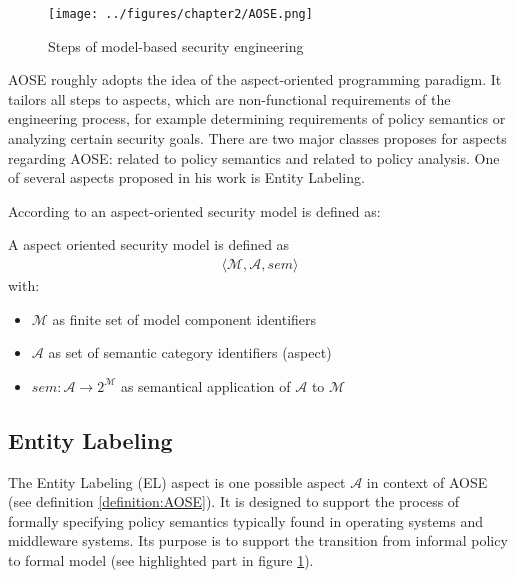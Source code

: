 \documentclass[twoside, openright, 12pt]{book}
\begin{document}
\begin{figure}[htb]
	\centering
	\texttt{[image: ../figures/chapter2/AOSE.png]}
	\caption{Steps of model-based security engineering \citep{Amthor18}}
	\label{fig:AOSE}
\end{figure}

\noindent
AOSE roughly adopts the idea of the aspect-oriented programming paradigm.
It tailors all steps to aspects, which are non-functional requirements of the engineering process, for example determining requirements of policy semantics or analyzing certain security goals.
There are two major classes \cite{Amthor18} proposes for aspects regarding AOSE: related to policy semantics and related to policy analysis.
One of several aspects proposed in his work is Entity Labeling.

According to \cite{Amthor18} an aspect-oriented security model is defined as:

\begin{xdefinition} 
A aspect oriented security model is defined as 
\begin{gather*}
\langle \mathcal{M},\mathcal{A},sem \rangle
\end{gather*}
with:

\vspace{-2mm}
\begin{itemize}
\setlength\itemsep{0em}
\item $\mathcal{M}$ as finite set of model component identifiers
\item $\mathcal{A}$ as set of semantic category identifiers (aspect)
\item $sem : \mathcal{A} \rightarrow 2^\mathcal{M}$ as semantical application of $\mathcal{A}$ to $\mathcal{M}$
\end{itemize}
\label{definition:AOSE}
\end{xdefinition}



\subsection{Entity Labeling}
\label{EL}
The Entity Labeling (EL) aspect is one possible aspect $\mathcal{A}$ in context of AOSE (see definition \ref{definition:AOSE}).
It is designed to support the process of formally specifying policy semantics typically found in operating systems and middleware systems.
Its purpose is to support the transition from informal policy to formal model (see highlighted part in figure \ref{fig:AOSE}).
\end{document}
